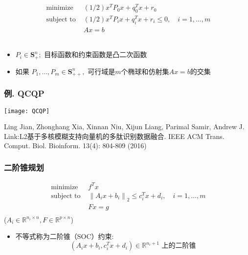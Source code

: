 \documentclass[handout]{beamer}
\begin{document}
\begin{frame}
\begin{frame}
		
		\begin{equation}
			\begin{array}{ll}
				\text { minimize } & (1 / 2) x^{T} P_{0} x+q_{0}^{T} x+r_{0} \\
				\text { subject to } & (1 / 2) x^{T} P_{i} x+q_{i}^{T} x+r_{i} \leq 0, \quad i=1, \ldots, m \\
				& A x=b
			\end{array}
		\end{equation}\\
		\begin{itemize}
			\item $P_{i} \in \mathbf{S}_{+}^{n} ;$ 目标函数和约束函数是凸二次函数 
			\item 如果 $P_{1}, \ldots, P_{m} \in \mathbf{S}_{++}^{n},$ 可行域是$m$个椭球和仿射集$Ax=b$的交集
		\end{itemize}
	\end{frame}
	
	\begin{frame}
		\frametitle{例. QCQP}
		
		\begin{center}
			\texttt{[image: QCQP]}
		\end{center}
		
		\begin{tiny}
			Ling Jian, Zhonghang Xia, Xinnan Niu, Xijun Liang, Parimal Samir, Andrew J. Link:L2基于多核模糊支持向量机的多肽识别数据融合. IEEE ACM Trans. Comput. Biol. Bioinform. 13(4): 804-809 (2016)
		\end{tiny}
		
		
	\end{frame}
	\begin{frame}
		\frametitle{二阶锥规划}
		\begin{equation}
			\begin{array}{ll}
				\text{ minimize } & f^{T} x \\
				\text { subject to } & \left\|A_{i} x+b_{i}\right\|_{2} \leq c_{i}^{T} x+d_{i}, \quad i=1, \ldots, m \\
				& F x=g \\
			\end{array}
		\end{equation}
		($A_{i} \in \mathbb{R}^{n_{i} \times n},F \in \mathbb{R}^{p \times n}$)\\
		\begin{itemize}[<+->]
			\item 不等式称为二阶锥（SOC）约束:
			\begin{equation}
				\left(A_{i} x+b_{i}, c_{i}^{T} x+d_{i}\right) \in \mathbb{R}^{n_{i}+1}\text { 上的二阶锥}
			\end{equation}
			

\end{itemize}
\end{frame}
\end{frame}
\end{document}
